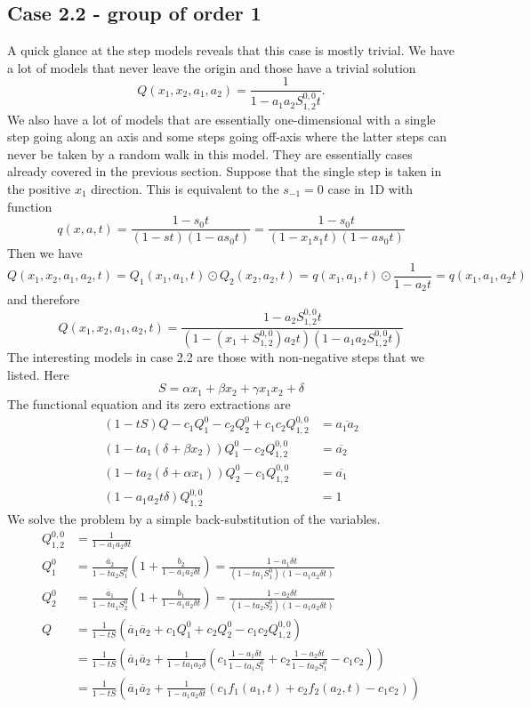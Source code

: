 \documentclass[12pt]{article}
\theoremstyle{definition} \newtheorem{definition}[theorem]{Definition}
\newcommand{\ol}[1]{\overline{#1}}
\newcommand{\Qf}[1]{Q_{1,2}^{#1}}
\newcommand{\Sf}[1]{S_{1,2}^{#1}}
\begin{document}
\subsection{Case 2.2 - group of order 1}
A quick glance at the step models reveals that this case is mostly trivial. We have a lot of models that never leave the origin and those have a trivial solution
\[
	Q(x_1,x_2,a_1,a_2) = \frac{1}{1-a_1a_2 \Sf{0,0} t}.
\]
We also have a lot of models that are essentially one-dimensional with a single step going along an axis and some steps going off-axis where the latter steps can never be taken by a random walk in this model. They are essentially cases already covered in the previous section. Suppose that the single step is taken in the positive $x_1$ direction. This is equivalent to the $s_{-1} = 0$ case in 1D with function
\[
	q(x,a,t) = \frac{1-s_0 t}{(1-st)(1-a s_0 t)} = \frac{1-s_0 t}{(1-x_1s_1 t)(1-a s_0 t)}
\]
Then we have
\[
	Q(x_1,x_2,a_1,a_2,t) = Q_1(x_1,a_1,t) \odot Q_2(x_2,a_2,t) =  q(x_1,a_1,t) \odot \frac{1}{1-a_2 t}= q(x_1,a_1,a_2 t)
\]
and therefore
\[
	Q(x_1,x_2,a_1,a_2,t) = \frac{1-a_2 \Sf{0,0} t}{(1-(x_1+\Sf{0,0})a_2 t)(1-a_1a_2 \Sf{0,0}t)}
\]
The interesting models in case 2.2 are those with non-negative steps that we listed. Here
\[
	S = \alpha x_1 + \beta x_2 + \gamma x_1 x_2 + \delta
\]
The functional equation and its zero extractions are
\begin{align*}
(1-tS)Q - c_1 Q_1^0- c_2 Q_2^0+ c_1c_2 Q_{1,2}^{0,0}  &= \ol{a_1a_2}\\
(1-ta_1 (\delta+\beta x_2))Q_1^0 - c_2Q_{1,2}^{0,0} &=\ol{a_2}\\
(1-ta_2 (\delta+\alpha x_1))Q_2^0 - c_1Q_{1,2}^{0,0}  &=\ol{a_1}\\
(1-a_1 a_2 t \delta)Q_{1,2}^{0,0} &= 1
\end{align*}
We solve the problem by a simple back-substitution of the variables.
\begin{align*}
\Qf{0,0} & = \frac{1}{1-a_1a_2\delta t}\\
Q_1^0 & = \frac{\ol{a}_2}{1-t a_2 S_1^0}\left(1+\frac{b_2}{1-a_1a_2 \delta t}\right) = \frac{1 -  a_1 \delta t}{(1-t a_1S_1^0)(1-a_1a_2\delta t)}\\
Q_2^0 & = \frac{\ol{a}_1}{1-t a_1 S_2^0}\left(1+\frac{b_1}{1-a_1a_2 \delta t}\right) = \frac{1 -  a_2 \delta t}{(1-t a_2S_2^0)(1-a_1a_2\delta t)}\\
Q &= \frac{1}{1-tS}(\ol{a}_1\ol{a}_2 + c_1 Q_1^0 + c_2 Q_2^0 - c_1 c_2 Q_{1,2}^{0,0})\\
&=\frac{1}{1-tS}\left (\ol{a}_1\ol{a}_2 + \frac{1}{1-ta_1a_2 \delta}\left(c_1 \frac{1 -  a_1 \delta t}{1-t a_1S_1^0} + c_2 \frac{1 -  a_2 \delta t}{1-t a_2S_1^0} - c_1 c_2 \right) \right)\\
&= \frac{1}{1-tS}\left(\ol{a}_1\ol{a}_2 + \frac{1}{1-a_1a_2\delta t}(c_1 f_1(a_1,t) + c_2 f_2(a_2,t)-c_1c_2)\right)
\end{align*}
\end{document}
